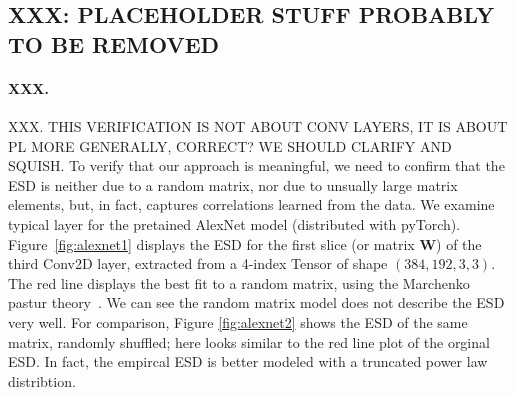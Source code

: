 \subsection{XXX: PLACEHOLDER STUFF PROBABLY TO BE REMOVED}


\paragraph{XXX.}
XXX.  THIS VERIFICATION IS NOT ABOUT CONV LAYERS, IT IS ABOUT PL MORE GENERALLY, CORRECT?  WE SHOULD CLARIFY AND SQUISH.
To verify that our approach is meaningful, we need to confirm that the ESD is neither due to a random matrix, nor due to unsually large matrix elements, but, in fact, captures correlations learned from the data. 
We examine typical layer for the pretained AlexNet model (distributed with pyTorch). 
Figure~\ref{fig:alexnet1} displays the ESD for the first slice (or matrix $\mathbf{W}$) of the third Conv2D layer, extracted from a 4-index Tensor of shape $(384, 192, 3, 3)$.  The red line displays the best fit to a random matrix, using the Marchenko pastur theory~\cite{MM18_TR}.  We can see the random matrix model does not describe the ESD very well. For comparison, Figure \ref{fig:alexnet2} shows the ESD of the same matrix, randomly shuffled; here looks similar to the red line plot of the orginal ESD.  In fact, the empircal ESD is better modeled with a truncated power law distribtion.

